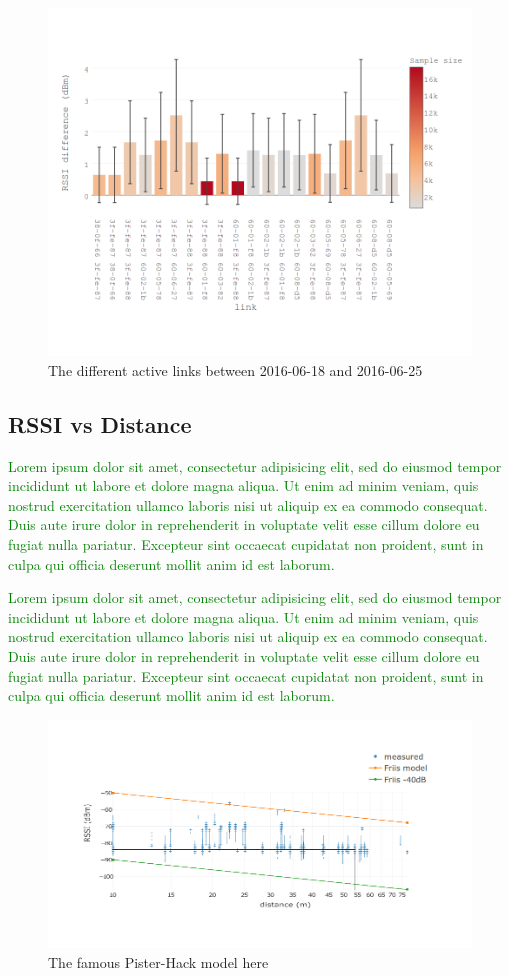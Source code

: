\documentclass{sig-alternate}
\newcommand{\lorem}               {\textcolor{green}{Lorem ipsum dolor sit amet, consectetur adipisicing elit, sed do eiusmod tempor incididunt ut labore et dolore magna aliqua. Ut enim ad minim veniam, quis nostrud exercitation ullamco laboris nisi ut aliquip ex ea commodo consequat. Duis aute irure dolor in reprehenderit in voluptate velit esse cillum dolore eu fugiat nulla pariatur. Excepteur sint occaecat cupidatat non proident, sunt in culpa qui officia deserunt mollit anim id est laborum.}}
\begin{document}
\begin{figure}
    \centering
    \includegraphics[width=\columnwidth]{sym_plot}
    \caption{The different active links between 2016-06-18 and 2016-06-25}
    \label{fig:tab_symmetry}
\end{figure}


\subsection{RSSI vs Distance}
\label{sec:rssi_distance}

\lorem

\lorem

\begin{figure}
    \centering
    \includegraphics[width=\columnwidth]{pister_hack}
    \caption{The famous Pister-Hack model here}
    \label{fig:pister_hack}
\end{figure}
\end{document}
